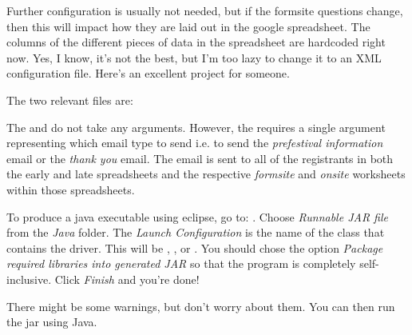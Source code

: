 \documentclass[12pt,final]{article}
\begin{document}

Further configuration is usually not needed, but if the formsite questions
change, then this will impact how they are laid out in the google spreadsheet.
The columns of the different pieces of data in the spreadsheet are hardcoded
right now. Yes, I know, it's not the best, but I'm too lazy to change it to an
XML configuration file. Here's an excellent project for someone.

The two relevant files are:
\benum
\eenum


The  and  do not take any
arguments. However, the  requires a single argument
representing which email type to send i.e. to send the \emph{prefestival
information} email or the \emph{thank you} email. The email is sent to all of
the  registrants in both the early and late spreadsheets and the
respective \emph{formsite} and \emph{onsite} worksheets within those
spreadsheets.


To produce a java executable using eclipse, go to:
. Choose \emph{Runnable JAR file} from the
\emph{Java} folder. The \emph{Launch Configuration} is the name of the class
that contains the driver. This will be ,
, or . You should chose the option
\emph{Package required libraries into generated JAR} so that the program is
completely self-inclusive. Click \emph{Finish} and you're done!

There might be some warnings, but don't worry about them. You can then run the
jar using Java.
\end{document}
